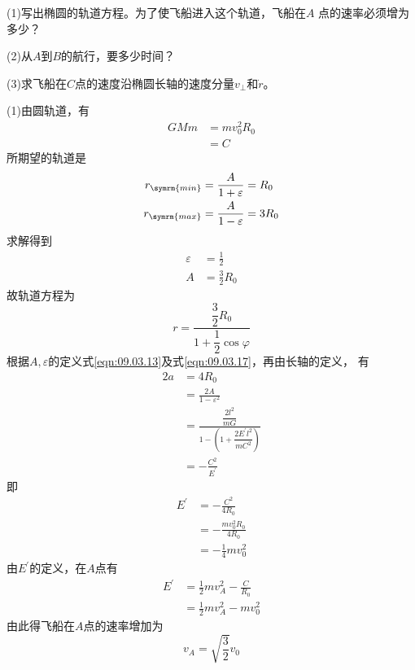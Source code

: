 (1)写出椭圆的轨道方程。为了使飞船进入这个轨道，飞船在$ A $
点的速率必须增为多少？

(2)从$ A $到$ B $的航行，要多少时间？


(3)求飞船在$ C $点的速度沿椭圆长轴的速度分量$ v _ \bot $和$ \dot{ r } $。

\solution (1)由圆轨道，有
\begin{equation*}
  \begin{split}
    G M m &= m v _ 0 ^ { 2 } R _ { 0 } \\
    &= C
  \end{split}
\end{equation*}
所期望的轨道是
\begin{align*}
  r _ { \symrm{ min } } & = \frac { A } { 1 + \varepsilon } = R _ { 0 }   \\
  r _ { \symrm{ max } } & = \frac { A } { 1 - \varepsilon } = 3 R _ { 0 }
\end{align*}
求解得到
\begin{align*}
  \varepsilon & = \frac { 1 } { 2 }           \\
  A           & = \frac { 3 } { 2 } R _ { 0 }
\end{align*}
故轨道方程为
\begin{equation*}
  r = \frac { \dfrac { 3 } { 2 } R _ { 0 } } { 1 + \dfrac { 1 } { 2 } \cos \varphi }
\end{equation*}
根据$ A , \varepsilon $的定义\lhbrak 式\eqref{eqn:09.03.13}及式\eqref{eqn:09.03.17}\rhbrak ，再由长轴的定义，
有
\begin{equation*}
  \begin{split}
    2 a &= 4 R _ { 0 } \\
    &= \frac { 2 A } { 1 - \varepsilon ^ { 2 } } \\
    &= \frac { \dfrac { 2 l ^ { 2 } } { m G } } { 1 - \left( 1 + \dfrac { 2  E ^ { \prime } l ^ { 2 } } { m C ^ { 2 } } \right) }\\
    &= - \frac { C ^ { 2 } } { E ^ { \prime } }
  \end{split}
\end{equation*}
即
\begin{equation*}
  \begin{split}
    E ^ { \prime } &= - \frac { C ^ { 2 } } { 4 R _ { 0 } } \\
    &= - \frac { m v _ 0 ^ { 2 } R _ { 0 } } { 4 R _ { 0 } } \\
    &= - \frac { 1 } { 4 } m v _ { 0 } ^ 2
  \end{split}
\end{equation*}
由$ E ^ { \prime } $的定义，在$ A $点有
\begin{equation*}
  \begin{split}
    E ^ { \prime } &= \frac { 1 } { 2 } m v _ A ^ { 2 } - \frac { C } { R _ { 0 } } \\
    &=  \frac { 1 } { 2 } m v _ A ^ { 2 } - m v _ 0 ^ { 2 }
  \end{split}
\end{equation*}
由此得飞船在$ A $点的速率增加为
\begin{equation*}
  v _ { A } = \sqrt { \frac { 3 } { 2 } } v _ { 0 }
\end{equation*}

